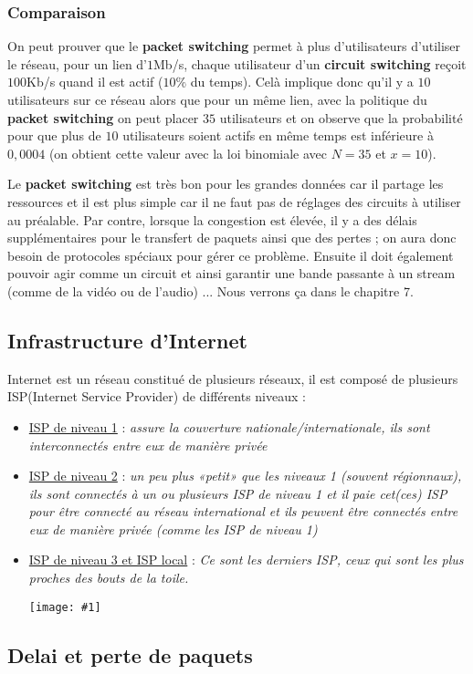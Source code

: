 \documentclass{article}
\newcommand{\ora}[1]{\textcolor{darko}{#1}}
\newcommand{\img}[1]{\begin{center}\texttt{[image: \#1]}\end{center}}
\newcommand{\point}[2]{\item \ora{\underline{#1}} : \textit{#2}}
\begin{document}
\subsubsection{Comparaison}

On peut prouver que le \textbf{packet switching} permet à plus d'utilisateurs d'utiliser le réseau, pour un lien
d'$1$Mb/s, chaque utilisateur d'un \textbf{circuit switching} reçoit $100$Kb/s quand il est actif ($10\%$ du 
temps). Celà implique donc qu'il y a $10$ utilisateurs sur ce réseau alors que pour un même lien, avec la 
politique du \textbf{packet switching} on peut placer $35$ utilisateurs et on observe que la probabilité pour que
plus de $10$ utilisateurs soient actifs en même temps est inférieure à $0,0004$ (on obtient cette valeur avec la
loi binomiale avec $N=35$ et $x=10$).

Le \textbf{packet switching} est très bon pour les grandes données car il partage les ressources et il est plus
simple car il ne faut pas de réglages des circuits à utiliser au préalable. Par contre, lorsque la congestion est
élevée, il y a des délais supplémentaires pour le transfert de paquets ainsi que des pertes ; on aura donc besoin
de protocoles spéciaux pour gérer ce problème. Ensuite il doit également pouvoir agir comme un circuit et ainsi
garantir une bande passante à un stream (comme de la vidéo ou de l'audio) ... Nous verrons ça dans le chapitre 7.

\subsection{Infrastructure d'Internet}

Internet est un réseau constitué de plusieurs réseaux, il est composé de plusieurs ISP(Internet Service Provider) 
de différents niveaux : 
\begin{itemize}
\point{ISP de niveau 1}{assure la couverture nationale/internationale, ils sont interconnectés entre eux de 
manière privée}
\point{ISP de niveau 2}{un peu plus «petit» que les niveaux 1 (souvent régionnaux), ils sont connectés à un ou 
plusieurs ISP de niveau 1 et il paie cet(ces) ISP pour être connecté au réseau international et ils peuvent être 
connectés entre eux de manière privée (comme les ISP de niveau 1)}
\point{ISP de niveau 3 et ISP local}{Ce sont les derniers ISP, ceux qui sont les plus proches des bouts de la 
toile.}
\img{CN_006.png}

\end{itemize}

\subsection{Delai et perte de paquets}
\end{document}
